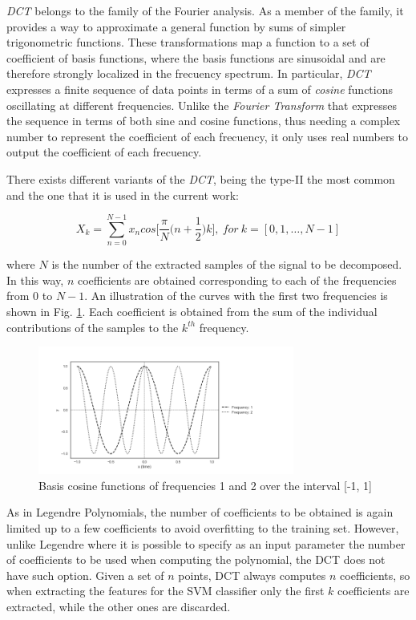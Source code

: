 \textit{DCT} belongs to the family of the Fourier analysis. As a member of the family, it
provides a way to approximate a general function by sums of simpler trigonometric functions.
These transformations map a function to a set of coefficient of basis functions, where
the basis functions are sinusoidal and are therefore strongly localized in the frecuency spectrum.
In particular, \textit{DCT} expresses a finite sequence of data points in terms of a sum of
\textit{cosine} functions oscillating at different frequencies. Unlike the
\textit{Fourier Transform} that expresses the sequence in terms of both sine and cosine functions,
thus needing a complex number to represent the coefficient of each frecuency, it only uses real
numbers to output the coefficient of each frecuency.

There exists different variants of the \textit{DCT}, being the type-II
the most common and the one that it is used in the current work:

\begin{equation}
X_{k} = \sum_{n=0}^{N-1} x_{n} cos \Big[ \frac{\pi}{N} \Big( n + \frac{1}{2} \Big) k \Big], \ for \ k = [0, 1, \dotsc, N-1]
\end{equation}

where $N$ is the number of the extracted samples of the signal to be decomposed.
In this way, $n$ coefficients are obtained corresponding to each of the frequencies from
$0$ to $N-1$. An illustration of the curves with the first two frequencies is shown in
Fig. \ref{fig:dct_base}. Each coefficient is obtained from the sum of the individual contributions
of the samples to the $k^{th}$ frequency.

\begin{figure}[H]
  \centering
  \includegraphics[width=0.75\textwidth]{files/figures/method/dct_base}
  \centering
  \caption{Basis cosine functions of frequencies 1 and 2 over the interval [-1, 1]}
  \label{fig:dct_base}
\end{figure}

As in Legendre Polynomials,
the number of coefficients to be obtained is again limited up to a few coefficients to
avoid overfitting to the training set. However, unlike Legendre where it is possible to
specify as an input parameter the number of coefficients to be used when computing the polynomial,
the DCT does not have such option. Given a set of $n$ points, DCT
always computes $n$ coefficients, so when extracting the features for the SVM classifier only
the first $k$ coefficients are extracted, while the other ones are discarded.

